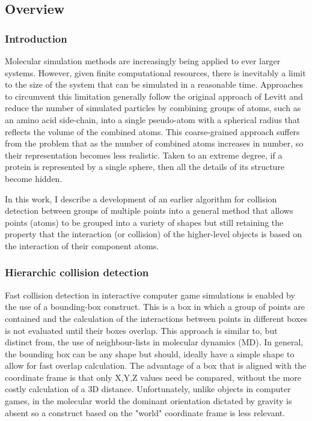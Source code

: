 \subsection{Overview}

\subsubsection{Introduction}

Molecular simulation methods are increasingly being applied to ever larger systems.
However, given finite computational resources, there is inevitably a limit to the
size of the system that can be simulated in a reasonable time.   Approaches to 
circumvent this limitation generally follow the original approach of Levitt and
reduce the number of simulated particles by combining groups of atoms, such as an
amino acid side-chain, into a single pseudo-atom with a spherical radius that
reflects the volume of the combined atoms.
This coarse-grained approach suffers from the problem that as the number of combined
atoms increases in number, so their representation becomes less realistic.  Taken
to an extreme degree, if a protein is represented by a single sphere, then all 
the details of its structure become hidden.  

In this work, I describe a development of an earlier algorithm for collision 
detection between groups of multiple points into a general method that allows
points (atoms) to be grouped into a variety of shapes but still retaining the 
property that the interaction (or collision) of the higher-level objects is based
on the interaction of their component atoms.

\subsubsection{Hierarchic collision detection}

Fast collision detection in interactive computer game simulations is enabled by the
use of a bounding-box construct.  This is a box in which a group of points are contained
and the calculation of the interactions between points in different boxes is not
evaluated until their boxes overlap.    This approach is similar to, but distinct from,
the use of neighbour-lists in molecular dynamics (MD).   In general, the bounding
box can be any shape but should, ideally have a simple shape to allow for fast
overlap calculation.    The advantage of a box that is aligned with the coordinate
frame is that only X,Y,Z values need be compared, without the more costly calculation
of a 3D distance. Unfortunately, unlike objects in computer games, in the molecular
world the dominant orientation dictated by gravity is absent so a construct based
on the "world" coordinate frame is less relevant.


